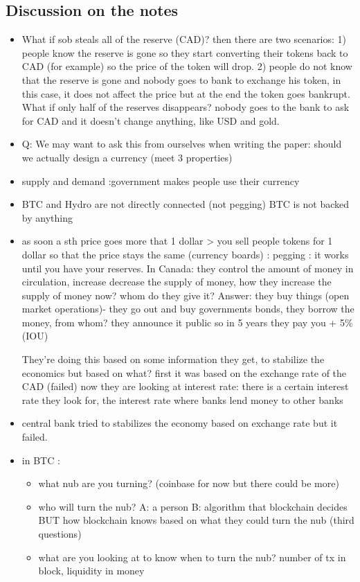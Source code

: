 \subsection {Discussion on the notes}
\begin{itemize}
\item What if sob steals all of the reserve (CAD)? then there are two scenarios: 1) people know the reserve is gone so they start converting their tokens back to CAD (for example) so the price of the token will drop. 2) people do not know that the reserve is gone and nobody goes to bank to exchange his token, in this case, it does not affect the price but at the end the token goes bankrupt. 
What if only half of the reserves disappears? nobody goes to the bank to ask for CAD and  it doesn’t change anything, like USD and gold.

\item Q: We may want to ask this from ourselves when writing the paper: should we actually design a currency (meet 3 properties) 

\item supply and demand :government makes people use their currency

\item BTC and Hydro are not directly connected (not pegging) BTC is not backed by anything

\item  as soon a sth price goes more that 1 dollar > you sell people tokens for 1 dollar so that the price stays the same (currency boards) : pegging : it works until you have your reserves.
In Canada: they control the amount of money in circulation, increase decrease the supply of money, how they increase the supply of money now? whom do they give it? Answer: they buy things (open market operations)- they go out and buy governments bonds, they borrow the money, from whom? they announce it public so in 5 years they pay you + 5\% (IOU) \par
They’re doing this based on some information they get, to stabilize the economics but based on what? first it was based on the exchange rate of the CAD (failed) now they are looking at interest rate: there is a certain interest rate they look for, the interest rate where banks lend money to other banks 

\item central bank tried to stabilizes the economy based on exchange rate but it failed.
\item in BTC : 
\begin {itemize}
\item what nub are you turning? (coinbase for now but there could be more)
\item who will turn the nub? A: a  person B: algorithm that blockchain decides BUT how blockchain knows based on what they could turn the nub (third questions)
\item what are you looking at to know when to turn the nub? number of tx in block, liquidity in money
\end{itemize}


\end{itemize}
